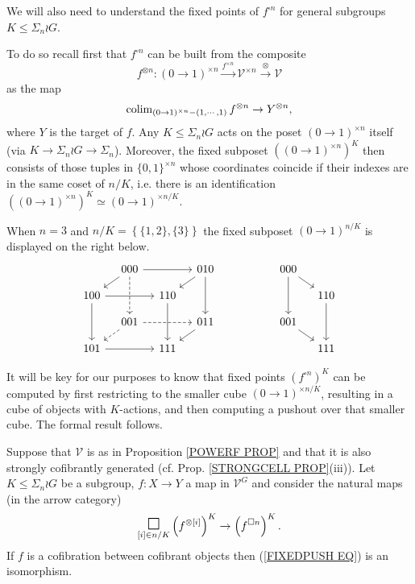 \documentclass[a4paper,10pt]{article}%
\begin{document}
We will also need to understand the fixed points of $f^{\square n}$ for general subgroups $K \leq \Sigma_n \wr G$.

To do so recall first that $f^{\square n}$ can be built 
from the composite 
\[
f^{\otimes n} \colon 
(0\to 1)^{\times n}
	\xrightarrow{f^{\times n}}
\mathcal{V}^{\times n}
	\xrightarrow{\otimes}
\mathcal{V}
\]
as the map
\[
\operatorname{colim}_{(0 \to 1)^{\times n} - (1,\cdots,1)} f^{\otimes n}
	\to 
Y^{\otimes n},
\]
where $Y$ is the target of $f$.
Any $K \leq \Sigma_n \wr G$ acts on the poset 
$(0 \to 1)^{\times n}$ itself 
(via $K \to \Sigma_n \wr G \to \Sigma_n$).
Moreover, the fixed subposet  
$\left((0 \to 1)^{\times n}\right)^K$
then consists of those tuples in $\{0,1\}^{\times n}$
whose coordinates coincide if their indexes are in the same coset of $n/K$, i.e. there is an identification
$\left((0 \to 1)^{\times n}\right)^K \simeq (0 \to 1)^{\times n/K}$.



\begin{example}
When $n=3$ and $n/K = \left\{\{1,2\},\{3\}\right\}$ the fixed subposet $(0 \to 1)^{n/K}$ is displayed on the right below.
\[
\begin{tikzcd}[column sep=1em, row sep=1em]
	& 000 \ar{rr} \ar{ld} \ar[dashed]{dd} && 010 \ar{ld} \ar{dd}&
	&&&& 000 \ar{dd} \ar{rd}
\\
	100 \ar{rr} \ar{dd} && 110 \ar{dd}&&
	&&&& & 110 \ar{dd}
\\
	& 001 \ar[dashed]{rr} \ar[dashed]{ld} && 011 \ar{ld}&
	&&&& 001 \ar{rd}
\\
	101 \ar{rr} && 111 &&
	&&&& & 111
\end{tikzcd}
\]
\end{example}


It will be key for our purposes to know that fixed points 
$\left( f^{\square n} \right)^K$ can be computed by first restricting to the smaller cube 
$(0 \to 1)^{\times n/K}$,
resulting in a cube of objects with $K$-actions,
and then computing a pushout over that smaller cube.
The formal result follows.


\begin{proposition}\label{FIXEDPUSH PROP}
	Suppose that $\mathcal{V}$ is as in Proposition \ref{POWERF PROP} and that it is also strongly cofibrantly generated (cf. Prop. \ref{STRONGCELL PROP}(iii)).
	Let $K \leq \Sigma_n \wr G$ be a subgroup, 
	$f \colon X \to Y$ a map in $\mathcal{V}^G$ and consider the natural maps (in the arrow category)
\begin{equation}\label{FIXEDPUSH EQ}
	\underset{[i] \in n/K}{\mathlarger{\mathlarger{\square}}}
	\left( f^{\otimes [i]} \right)^K
\to
	\left( f^{\square n} \right)^K.
\end{equation}
If $f$ is a cofibration between cofibrant objects then 
(\ref{FIXEDPUSH EQ}) is an isomorphism.
\end{proposition}
\end{document}
